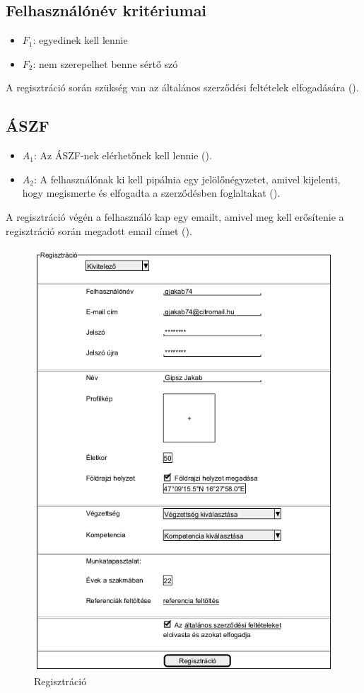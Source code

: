\subsection{Felhasználónév kritériumai}

\begin{itemize}
    \item $F_1$: egyedinek kell lennie
    \item $F_2$: nem szerepelhet benne sértő szó
\end{itemize}

A regisztráció során szükség van az általános szerződési feltételek elfogadására ().

\subsection{ÁSZF}

\begin{itemize}
    \item $A_1$: Az ÁSZF-nek elérhetőnek kell lennie ().
    \item $A_2$: A felhasználónak ki kell pipálnia egy jelölőnégyzetet, amivel kijelenti, hogy megismerte és elfogadta a szerződésben foglaltakat ().
\end{itemize}

A regisztráció végén a felhasználó kap egy emailt, amivel meg kell erősítenie a regisztráció során megadott email címet ().

\begin{figure}[h]
	\centering
	\includegraphics[scale=0.5]{img/regisztracio.png}
	\caption*{Regisztráció}
	\label{fig:reg}
\end{figure}